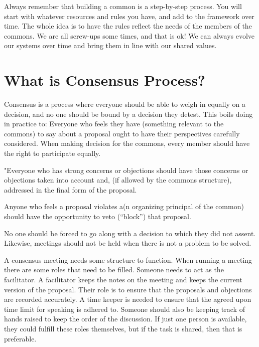 \documentclass{article}
\begin{document}
\vspace{0.2cm}
Always remember that building a common is a step-by-step process. You will start with whatever resources and rules you have, and add to the framework over time. The whole idea is to have the rules reflect the needs of the members of the commons. We are all screw-ups some times, and that is ok! We can always evolve our systems over time and bring them in line with our shared values. 




\pagebreak

\section{What is Consensus Process?}

Consensus is a process where everyone should be able to weigh in equally on a decision, and no one should be bound by a decision they detest. This boils doing in practice to: Everyone who feels they have (something relevant to the commons) to say about a proposal ought to have their perspectives carefully considered. When making decision for the commons, every member should have the right to participate equally.

"Everyone who has strong concerns or objections should have those concerns or objections taken into account and, (if allowed by the commons structure), addressed in the final form of the proposal.

Anyone who feels a proposal violates a(n organizing principal of the common) should have the opportunity to veto (“block”) that proposal.

No one should be forced to go along with a decision to which they did not assent. Likewise, meetings should not be held when there is not a problem to be solved. 

A consensus meeting needs some structure to function. When running a meeting there are some roles that need to be filled. Someone needs to act as the facilitator. A facilitator keeps the notes on the meeting and keeps the current version of the proposal. Their role is to ensure that the proposals and objections are recorded accurately. A time keeper is needed to ensure that the agreed upon time limit for speaking is adhered to. Someone should also be keeping track of hands raised to keep the order of the discussion. If just one person is available, they could fulfill these roles themselves, but if the task is shared, then that is preferable. 
\end{document}
